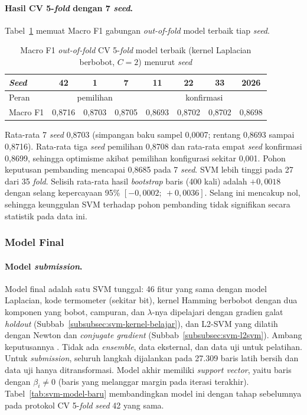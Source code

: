 \paragraph{Hasil CV 5-\textit{fold} dengan 7 \textit{seed}.} Tabel~\ref{tab:svm-seed} memuat Macro F1 gabungan \textit{out-of-fold} model terbaik tiap \textit{seed}.

\begin{table}[H]
	\centering
	\caption{Macro F1 \textit{out-of-fold} CV 5-\textit{fold} model terbaik (kernel Laplacian berbobot, $C = 2$) menurut \textit{seed}}
	\label{tab:svm-seed}
	\small
	\begin{tabular}{l c c c c c c c}
		\toprule
		\textit{Seed} & 42 & 1 & 7 & 11 & 22 & 33 & 2026 \\
		\midrule
		Peran & \multicolumn{3}{c}{pemilihan} & \multicolumn{4}{c}{konfirmasi} \\
		Macro F1 & 0,8716 & 0,8703 & 0,8705 & 0,8693 & 0,8702 & 0,8702 & 0,8698 \\
		\bottomrule
	\end{tabular}
\end{table}

Rata-rata 7 \textit{seed} 0,8703 (simpangan baku sampel 0,0007; rentang 0,8693 sampai 0,8716). Rata-rata tiga \textit{seed} pemilihan 0,8708 dan rata-rata empat \textit{seed} konfirmasi 0,8699, sehingga optimisme akibat pemilihan konfigurasi sekitar 0,001. Pohon keputusan pembanding mencapai 0,8685 pada 7 \textit{seed}. SVM lebih tinggi pada 27 dari 35 \textit{fold}. Selisih rata-rata hasil \textit{bootstrap} baris (400 kali) adalah $+0{,}0018$ dengan selang kepercayaan 95\% $[-0{,}0002;\ +0{,}0036]$. Selang ini mencakup nol, sehingga keunggulan SVM terhadap pohon pembanding tidak signifikan secara statistik pada data ini.

\subsubsection{Model Final}
\label{subsubsec:svm-final}
\paragraph{Model \textit{submission}.} Model final adalah satu SVM tunggal: 46 fitur yang sama dengan model Laplacian, kode termometer (sekitar \SVMBaruJumlahBit{} bit), kernel Hamming berbobot dengan dua komponen yang bobot, campuran, dan $\lambda$-nya dipelajari dengan gradien galat \textit{holdout} (Subbab~\ref{subsubsec:svm-kernel-belajar}), dan L2-SVM yang dilatih dengan Newton dan \textit{conjugate gradient} (Subbab~\ref{subsubsec:svm-l2svm}). Ambang keputusannya \SVMBaruAmbang{}. Tidak ada \textit{ensemble}, data eksternal, dan data uji untuk pelatihan. Untuk \textit{submission}, seluruh langkah dijalankan pada 27.309 baris latih bersih dan data uji hanya ditransformasi. Model akhir memiliki \SVMBaruJumlahSV{} \textit{support vector}, yaitu baris dengan $\beta_i \ne 0$ (baris yang melanggar margin pada iterasi terakhir). Tabel~\ref{tab:svm-model-baru} membandingkan model ini dengan tahap sebelumnya pada protokol CV 5-\textit{fold} \textit{seed} 42 yang sama.

